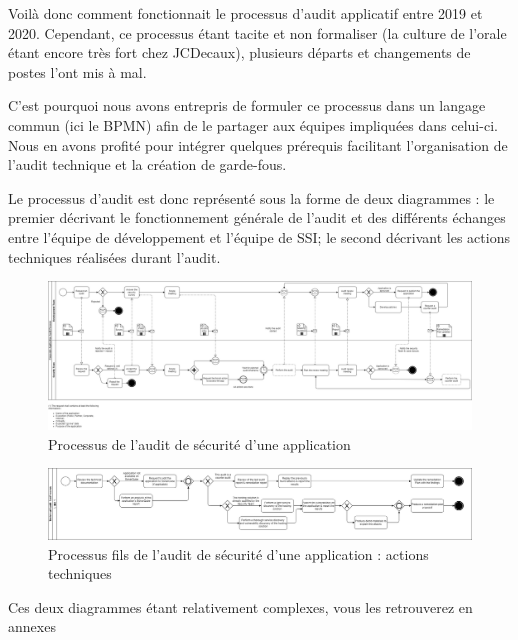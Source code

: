 Voilà donc comment fonctionnait le processus d'audit applicatif entre 2019 et 2020. 
\newline Cependant, ce processus étant tacite et non formaliser (la culture de l'orale étant encore très fort chez 
JCDecaux), plusieurs départs et changements de postes l'ont mis à mal.

C'est pourquoi nous avons entrepris de formuler ce processus dans un langage commun (ici le \ac{BPMN}) afin de le partager
aux équipes impliquées dans celui-ci. Nous en avons profité pour intégrer quelques prérequis facilitant l'organisation 
de l'audit technique et la création de garde-fous.

\newpage

Le processus d'audit est donc représenté sous la forme de deux diagrammes : le premier décrivant le fonctionnement 
générale de l'audit et des différents échanges entre l'équipe de développement et l'équipe de \ac{SSI}; le second 
décrivant les actions techniques réalisées durant l'audit.

\begin{figure}[h]
    \centering
    \includegraphics[width=\linewidth]{resources/img/process_audit.png}
    \caption{Processus de l'audit de sécurité d'une application}
\end{figure}

\begin{figure}[h]
    \centering
    \includegraphics[width=\linewidth]{resources/img/technical_audit_subprocess.png}
    \caption{Processus fils de l'audit de sécurité d'une application : actions techniques}
\end{figure}
\begin{center}
    \colorbox{gray!15}{Ces deux diagrammes étant relativement complexes, vous les retrouverez en annexes}
\end{center}

